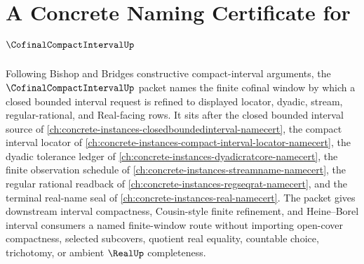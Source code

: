 \chapter{A Concrete Naming Certificate for $\CofinalCompactIntervalUp$}
\label{ch:concrete-instances-cofinal-compact-interval-namecert}

Following Bishop and Bridges constructive compact-interval arguments, the $\CofinalCompactIntervalUp$ packet names the finite cofinal window by which a closed bounded interval request is refined to displayed locator, dyadic, stream, regular-rational, and Real-facing rows. It sits after the closed bounded interval source of \autoref{ch:concrete-instances-closedboundedinterval-namecert}, the compact interval locator of \autoref{ch:concrete-instances-compact-interval-locator-namecert}, the dyadic tolerance ledger of \autoref{ch:concrete-instances-dyadicratcore-namecert}, the finite observation schedule of \autoref{ch:concrete-instances-streamname-namecert}, the regular rational readback of \autoref{ch:concrete-instances-regseqrat-namecert}, and the terminal real-name seal of \autoref{ch:concrete-instances-real-namecert}. The packet gives downstream interval compactness, Cousin-style finite refinement, and Heine--Borel interval consumers a named finite-window route without importing open-cover compactness, selected subcovers, quotient real equality, countable choice, trichotomy, or ambient $\RealUp$ completeness.

